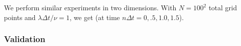 \documentclass[12pt]{article}
\begin{document}
We perform similar experiments in two dimensions. With $N = 100^2$ total grid points and $\lambda \Delta t/\nu = 1$, we get (at time $n\Delta t = 0, .5, 1.0, 1.5$).
\begin{figure}[H]
\end{figure}

\subsubsection{Validation}
\end{document}
